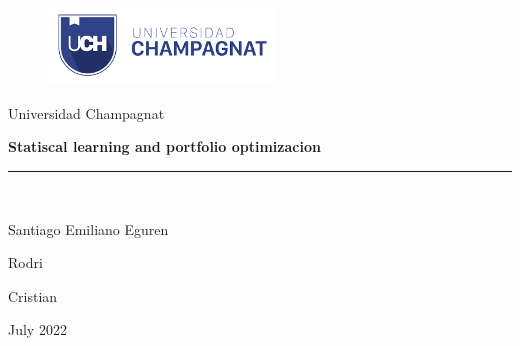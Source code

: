 \documentclass[12pt]{article}
\begin{document}



\begin{titlepage}

\begin{center}
\vspace*{-1in}
\begin{figure}[htb]
\begin{center}
\includegraphics[width=6cm]{index}
\end{center}
\end{figure}








Universidad Champagnat\\
\vspace*{0.15in}




\begin{Large}
\textbf{Statiscal learning and portfolio optimizacion } \\
\end{Large}
\vspace*{0.3in}



\rule{80mm}{0.1mm}\\
\vspace*{0.1in}


\begin{large}
Santiago Emiliano Eguren
\end{large}
\vspace*{0.3in}




\begin{large}
Rodri\\
\end{large}
\vspace*{0.3in}



\begin{large}
Cristian\\
\end{large}
\vspace*{0.3in}


\begin{large}
July 2022
\end{large}
\vspace*{0.3in}



\end{center}

\end{titlepage}
\end{document}
